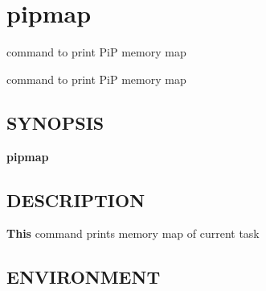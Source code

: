\hypertarget{group__pipmap}{\section{pipmap}
\label{group__pipmap}
}


command to print Pi\-P memory map  


command to print Pi\-P memory map \hypertarget{group__pipcc_synopsis}{}\subsection{S\-Y\-N\-O\-P\-S\-I\-S}\label{group__pipcc_synopsis}
{\bfseries pipmap} \hypertarget{group__pipmap_description}{}\subsection{D\-E\-S\-C\-R\-I\-P\-T\-I\-O\-N}\label{group__pipmap_description}
{\bfseries This} command prints memory map of current task\hypertarget{group__pipmap_environment}{}\subsection{E\-N\-V\-I\-R\-O\-N\-M\-E\-N\-T}\label{group__pipmap_environment}
